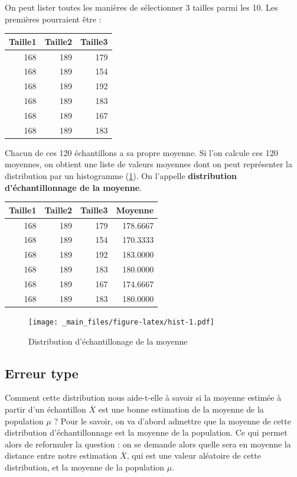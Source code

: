 \documentclass[
]{book}
\begin{document}
On peut lister toutes les manières de sélectionner 3 tailles parmi les 10. Les premières pourraient être :

\begin{tabular}{r|r|r}
\hline
Taille1 & Taille2 & Taille3\\
\hline
168 & 189 & 179\\
\hline
168 & 189 & 154\\
\hline
168 & 189 & 192\\
\hline
168 & 189 & 183\\
\hline
168 & 189 & 167\\
\hline
168 & 189 & 183\\
\hline
\end{tabular}

Chacun de ces 120 échantillons a sa propre moyenne. Si l'on calcule ces 120 moyennes, on obtient une liste de valeurs moyennes dont on peut représenter la distribution par un histogramme (\ref{fig:hist}). On l'appelle \textbf{distribution d'échantillonnage de la moyenne}.

\begin{tabular}{r|r|r|r}
\hline
Taille1 & Taille2 & Taille3 & Moyenne\\
\hline
168 & 189 & 179 & 178.6667\\
\hline
168 & 189 & 154 & 170.3333\\
\hline
168 & 189 & 192 & 183.0000\\
\hline
168 & 189 & 183 & 180.0000\\
\hline
168 & 189 & 167 & 174.6667\\
\hline
168 & 189 & 183 & 180.0000\\
\hline
\end{tabular}

\begin{figure}
\centering
\texttt{[image: \_main\_files/figure-latex/hist-1.pdf]}
\caption{\label{fig:hist}Distribution d'échantillonage de la moyenne}
\end{figure}

\hypertarget{erreur-type}{%
\subsection{Erreur type}\label{erreur-type}}

Comment cette distribution nous aide-t-elle à savoir si la moyenne estimée à partir d'un échantillon \(\overline{X}\) est une bonne estimation de la moyenne de la population \(\mu\) ? Pour le savoir, on va d'abord admettre que la moyenne de cette distribution d'échantillonnage est la moyenne de la population. Ce qui permet alors de reformuler la question : on se demande alors quelle sera en moyenne la distance entre notre estimation \(\overline{X}\), qui est une valeur aléatoire de cette distribution, et la moyenne de la population \(\mu\).
\end{document}
